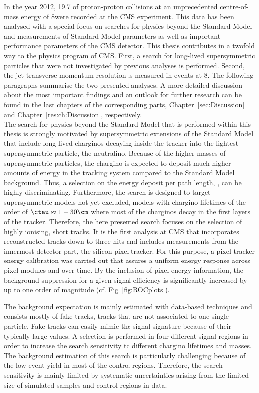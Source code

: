 In the year 2012, 19.7 \fbinv of proton-proton collisions at an unprecedented centre-of-mass energy of 8\tev were recorded at the CMS experiment.
This data has been analysed with a special focus on searches for physics beyond the Standard Model and measurements of Standard Model parameters as well as important performance parameters of the CMS detector.
This thesis contributes in a twofold way to the physics program of CMS.
First, a search for long-lived supersymmetric particles that were not investigated by previous analyses is performed.
Second, the jet transverse-momentum resolution is measured in \GAMJET events at 8\tev.
The following paragraphs summarise the two presented analyses.
A more detailed discussion about the most important findings and an outlook for further research can be found in the last chapters of the corresponding parts, Chapter~\ref{sec:Discussion} and Chapter~\ref{res:ch:Discussion}, respectively.\\

The search for physics beyond the Standard Model that is performed within this thesis is strongly motivated by supersymmetric extensions of the Standard Model that include long-lived charginos decaying inside the tracker into the lightest supersymmetric particle, the neutralino.
Because of the higher masses of supersymmetric particles, the chargino is expected to deposit much higher amounts of energy in the tracking system compared to the Standard Model background.
Thus, a selection on the energy deposit per path length, \dedx, can be highly discriminating.
Furthermore, the search is designed to target supersymmetric models not yet excluded, \ie models with chargino lifetimes of the order of $\ctau \approx 1- 30\cm$ where most of the charginos decay in the first layers of the tracker.
Therefore, the here presented search focuses on the selection of highly ionising, short tracks.
It is the first analysis at CMS that incorporates reconstructed tracks down to three hits and includes \dedx measurements from the innermost detector part, the silicon pixel tracker.
For this purpose, a pixel tracker energy calibration was carried out that assures a uniform energy response across pixel modules and over time.
By the inclusion of pixel energy information, the background suppression for a given signal efficiency is significantly increased by up to one order of magnitude (cf. Fig~\ref{fig:ROCplots}).

The background expectation is mainly estimated with data-based techniques and consists mostly of fake tracks, \ie tracks that are not associated to one single particle. 
Fake tracks can easily mimic the signal signature because of their typically large \dedx values.
A selection is performed in four different signal regions in order to increase the search sensitivity to different chargino lifetimes and masses.
The background estimation of this search is particularly challenging because of the low event yield in most of the control regions.
Therefore, the search sensitivity is mainly limited by systematic uncertainties arising from the limited size of simulated samples and control regions in data.

